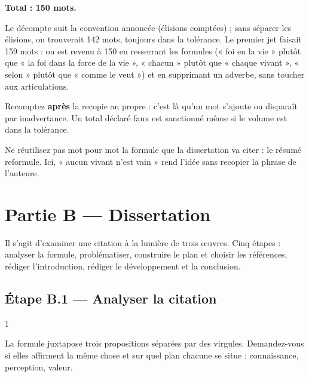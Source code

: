 \documentclass[11pt,a4paper]{article}
\begin{document}
\textbf{Total : 150 mots.}

Le décompte suit la convention annoncée (élisions comptées) ; sans séparer les élisions, on trouverait 142 mots, toujours dans la tolérance. Le premier jet faisait 159 mots : on est revenu à 150 en resserrant les formules (« foi en la vie » plutôt que « la foi dans la force de la vie », « chacun » plutôt que « chaque vivant », « selon » plutôt que « comme le veut ») et en supprimant un adverbe, sans toucher aux articulations.

\begin{methode}

Recomptez \textbf{après} la recopie au propre : c'est là qu'un mot s'ajoute ou disparaît par inadvertance. Un total déclaré faux est sanctionné même si le volume est dans la tolérance.

\end{methode}

\begin{piege}

Ne réutilisez pas mot pour mot la formule que la dissertation va citer : le résumé reformule. Ici, « aucun vivant n'est vain » rend l'idée sans recopier la phrase de l'auteure.

\end{piege}

\hypertarget{partie-b-dissertation}{%
\section{Partie B --- Dissertation}\label{partie-b-dissertation}}

Il s'agit d'examiner une citation à la lumière de trois œuvres. Cinq étapes : analyser la formule, problématiser, construire le plan et choisir les références, rédiger l'introduction, rédiger le développement et la conclusion.

\hypertarget{uxe9tape-b.1-analyser-la-citation}{%
\subsection{Étape B.1 --- Analyser la citation}\label{uxe9tape-b.1-analyser-la-citation}}

\begin{indication}{1}

La formule juxtapose trois propositions séparées par des virgules. Demandez-vous si elles affirment la même chose et sur quel plan chacune se situe : connaissance, perception, valeur.

\end{indication}
\end{document}
